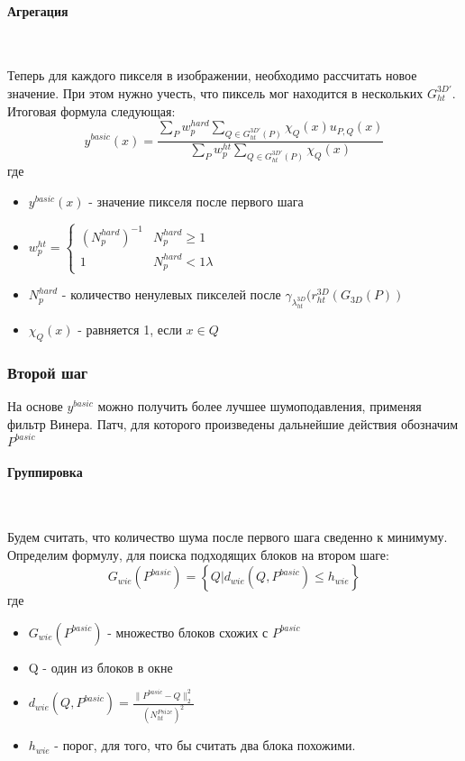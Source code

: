 \paragraph{Агрегация}\

Теперь для каждого пикселя в изображении, необходимо рассчитать новое значение. При этом нужно учесть, что пиксель мог находится в нескольких $G_{ht}^{3D'}$. Итоговая формула следующая:
\begin{equation}
	y^{basic}(x) = \frac{\sum\limits_Pw_p^{hard}\sum\limits_{Q \in G_{ht}^{3D'}(P)}\chi_Q(x)u_{P,Q}(x)}{\sum\limits_Pw_p^{ht}\sum\limits_{Q \in G_{ht}^{3D'}(P)}\chi_Q(x)}
\end{equation}
где
\begin{itemize}
	\item $y^{basic}(x)$ - значение пикселя после первого шага 
	\item $w_p^{ht}  = \begin{cases}(N_p^{hard})^{-1} & N_p^{hard} \geq 1\\ 1 & N_p^{hard} < 1 \lambda\end{cases}$
	\item $N_p^{hard}$ - количество ненулевых пикселей после $\gamma_{\lambda_{ht}^{3D}}(r_{ht}^{3D}(G_{3D}(P))$
	\item $\chi_Q(x)$ - равняется 1, если $x\in Q$
\end{itemize}

\subsubsection{Второй шаг}
На основе $y^{basic}$ можно получить более лучшее шумоподавления, применяя фильтр Винера. Патч, для которого произведены дальнейшие действия обозначим $P^{basic}$
\paragraph{Группировка}\

Будем считать, что количество шума после первого шага сведенно к минимуму. Определим формулу, для поиска подходящих блоков на втором шаге:
\begin{equation}
	G_{wie}(P^{basic}) = \left\{Q | d_{wie}(Q,P^{basic}) \leq h_{wie}\right\}
\end{equation}
где
\begin{itemize}
	\item $G_{wie}(P^{basic})$ - множество блоков схожих с $P^{basic}$
	\item Q - один из блоков в окне
	\item $d_{wie}(Q,P^{basic}) = \frac{\parallel P^{basic} - Q\parallel_2^2}{(N_{ht}^{Psize})^2}$
	\item $h_{wie}$ - порог, для того, что бы считать два блока похожими.
\end{itemize}

